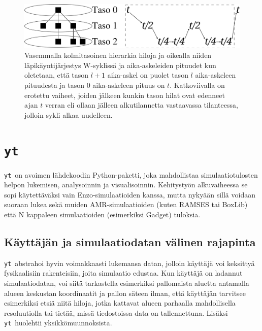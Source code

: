 \documentclass[12pt,a4paper]{article}
\newcommand{\yt}{\texttt{yt}}
\begin{document}
\begin{figure}
   \centering
   \includegraphics[width=\textwidth]{../kuvat/W-cycle.png}
   \caption{Vasemmalla kolmitasoinen hierarkia hiloja ja oikealla niiden läpikäyntijärjestys W-syklissä ja aika-askeleiden pituudet kun oletetaan, että tason $l+1$ aika-askel on puolet tason $l$ aika-askeleen pituudesta ja tason $0$ aika-askeleen pituus on $t$. Katkoviivalla on erotettu vaiheet, joiden jälkeen kunkin tason hilat ovat edenneet ajan $t$ verran eli ollaan jälleen alkutilannetta vastaavassa tilanteessa, jolloin sykli alkaa uudelleen.}\label{fig:w-cycle}
\end{figure}




\section{\yt}
\yt\ on avoimen lähdekoodin Python-paketti, joka mahdollistaa simulaatiotulosten helpon lukemisen, analysoinnin ja visualisoinnin. Kehitystyön alkuvaiheessa se sopi käytettä\-väksi vain Enzo-simulaatioiden kanssa, mutta nykyään sillä voidaan suoraan lukea sekä muiden AMR-simulaatioiden (kuten RAMSES tai BoxLib) että N kappaleen simulaatioiden (esimerkiksi Gadget) tuloksia. \cite{yt} %

\subsection{Käyttäjän ja simulaatiodatan välinen rajapinta}
\yt\ abstrahoi hyvin voimakkaasti lukemansa datan, jolloin käyttäjä voi keksittyä fysikaalisiin rakenteisiin, joita simulaatio edustaa. Kun käyttäjä on ladannut simulaatiodatan, voi siitä tarkastella esimerkiksi pallomaista aluetta antamalla alueen keskustan koordinaatit ja pallon säteen ilman, että käyttäjän tarvitsee esimerkiksi etsiä niitä hiloja, jotka kattavat alueen parhaalla mahdollisella resoluutiolla tai tietää, missä tiedostoissa data on tallennettuna. Lisäksi \yt\ huolehtii yksikkömuunnoksista. \cite{yt}
\end{document}
